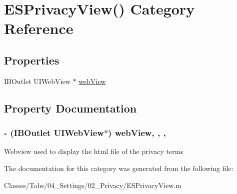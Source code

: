 \hypertarget{category_e_s_privacy_view_07_08}{}\section{E\+S\+Privacy\+View() Category Reference}
\label{category_e_s_privacy_view_07_08}
\subsection*{Properties}
\begin{DoxyCompactItemize}
\item 
I\+B\+Outlet U\+I\+Web\+View $\ast$ \hyperlink{category_e_s_privacy_view_07_08_a011528b0b028c7f9135acf9e33940f39}{web\+View}
\end{DoxyCompactItemize}


\subsection{Property Documentation}
\hypertarget{category_e_s_privacy_view_07_08_a011528b0b028c7f9135acf9e33940f39}{}
\subsubsection[{web\+View}]{\setlength{\rightskip}{0pt plus 5cm}-\/ (I\+B\+Outlet U\+I\+Web\+View$\ast$) web\+View\hspace{0.3cm}{\ttfamily [read]}, {\ttfamily [write]}, {\ttfamily [nonatomic]}, {\ttfamily [strong]}}\label{category_e_s_privacy_view_07_08_a011528b0b028c7f9135acf9e33940f39}
Webview used to display the html file of the privacy terms 

The documentation for this category was generated from the following file\+:\begin{DoxyCompactItemize}
\item 
Classes/\+Tabs/04\+\_\+\+Settings/02\+\_\+\+Privacy/E\+S\+Privacy\+View.\+m\end{DoxyCompactItemize}
